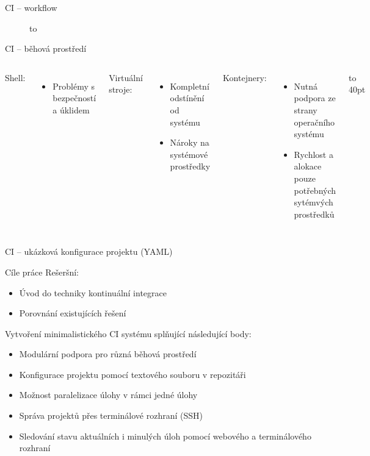 \documentclass{beamer}
\begin{document}
	\begin{frame}{CI -- workflow}
		\begin{figure}
			\vbox to \vsize {
				\vfill
				
				\vfill
			}
		\end{figure}
	\end{frame}

	\begin{frame}{CI -- běhová prostředí}
		\bigskip\bigskip
		
		\begin{columns}[T,onlytextwidth]
				Shell:
				\begin{itemize}
					\item Problémy s bezpečností a úklidem
				\end{itemize}
				Virtuální stroje:
				\begin{itemize}
					\item Kompletní odstínění od systému
					\item Nároky na systémové prostředky
				\end{itemize}
				Kontejnery:
				\begin{itemize}
					\item Nutná podpora ze strany operačního systému
					\item Rychlost a alokace pouze potřebných sytémvých prostředků
				\end{itemize}
				\vbox to 40pt{}
				
				
		\end{columns}
		
	\end{frame}

	\begin{frame}{CI -- ukázková konfigurace projektu (YAML)}
		\exampleCode
	\end{frame}

	\begin{frame}{Cíle práce}
		Rešeršní:
		\begin{itemize}
			\item Úvod do techniky kontinuální integrace
			\item Porovnání existujících řešení
		\end{itemize}
		
		Vytvoření minimalistického CI systému splňující následující body:
		\begin{itemize}
			\item Modulární podpora pro různá běhová prostředí
			\item Konfigurace projektu pomocí textového souboru v repozitáři
			\item Možnost paralelizace úlohy v rámci jedné úlohy
			\item Správa projektů přes terminálové rozhraní (SSH)
			\item Sledování stavu aktuálních i minulých úloh pomocí webového a terminálového rozhraní
		\end{itemize}

	\end{frame}
\end{document}
